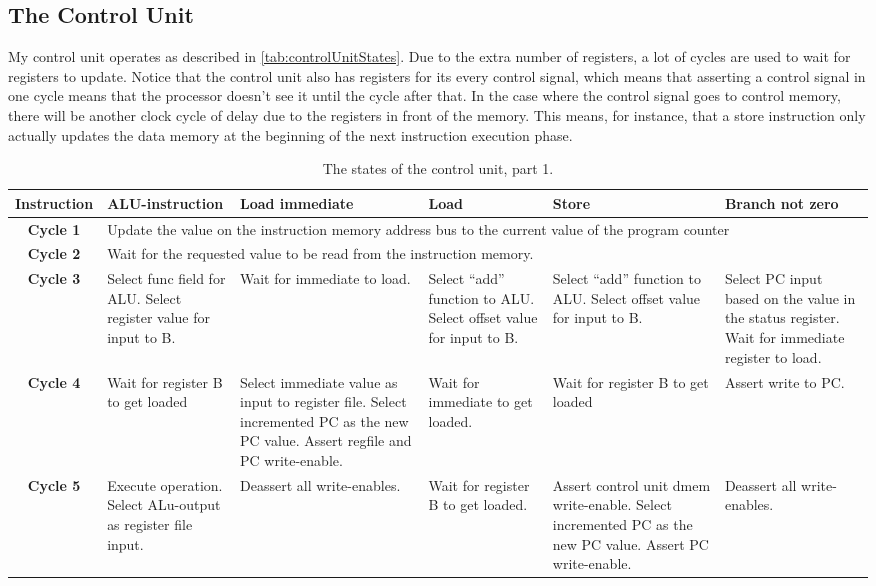 \documentclass[11pt]{article}
\begin{document}
\subsection{The Control Unit}
\label{subsec:controlunit}
My control unit operates as described in
\autoref{tab:controlUnitStates}. Due to the extra number of registers,
a lot of cycles are used to wait for registers to update. Notice that
the control unit also has registers for its every control signal,
which means that asserting a control signal in one cycle means that the
processor doesn't see it until the cycle after that. In the case where
the control signal goes to control memory, there will be another clock
cycle of delay due to the registers in front of the memory. This means,
for instance, that a store instruction only actually updates the data
memory at the beginning of the next instruction execution phase.
\begin{table}[htbp]
  \centering
  \begin{tabular}{|c|p{50pt}|p{50pt}|p{50pt}|p{50pt}|p{50pt}|}
    \hline
    {\bf Instruction} & {\bf ALU-instruction} & {\bf Load immediate} & {\bf Load} & {\bf Store} & {\bf Branch not zero} \\ \hline
    {\bf Cycle 1} & \multicolumn{5}{|p{250pt}|}{Update the value on the instruction memory address bus to the current value of the program counter} \\ \hline
    {\bf Cycle 2} & \multicolumn{5}{|p{250pt}|}{Wait for the requested value to be read from the instruction memory.} \\ \hline
    {\bf Cycle 3} & Select func field for ALU. Select register value for input to B. & Wait for immediate to load. & Select ``add'' function to ALU. Select offset value for input to B. & Select ``add'' function to ALU. Select offset value for input to B. & Select PC input based on the value in the status register. Wait for immediate register to load. \\ \hline
    {\bf Cycle 4} & Wait for register B to get loaded & Select immediate value as input to register file. Select incremented PC as the new PC value. Assert regfile and PC write-enable.  & Wait for immediate to get loaded. & Wait for register B to get loaded & Assert write to PC.  \\ \hline
    {\bf Cycle 5} & Execute operation. Select ALu-output as register file input. & Deassert all write-enables. & Wait for register B to get loaded. & Assert control unit dmem write-enable. Select incremented PC as the new PC value. Assert PC write-enable. & Deassert all write-enables. \\ \hline
  \end{tabular}
  \caption{The states of the control unit, part 1.}
  \label{tab:controlUnitStates}
\end{table}
\end{document}
